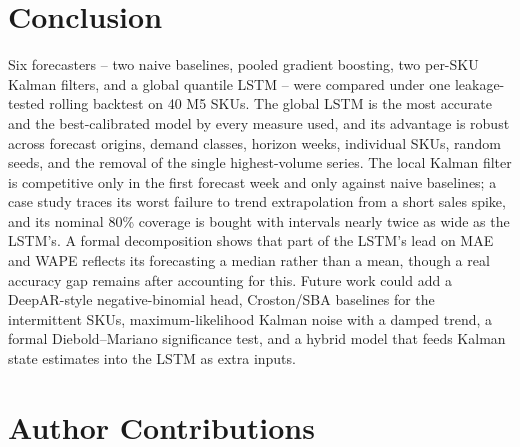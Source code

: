 \documentclass[conference]{IEEEtran}
\begin{document}
\section{Conclusion}
\label{sec:conclusion}
Six forecasters -- two naive baselines, pooled gradient boosting, two per-SKU Kalman filters, and a
global quantile LSTM -- were compared under one leakage-tested rolling backtest on 40 M5 SKUs. The
global LSTM is the most accurate and the best-calibrated model by every measure used, and its
advantage is robust across forecast origins, demand classes, horizon weeks, individual SKUs, random
seeds, and the removal of the single highest-volume series. The local Kalman filter is competitive
only in the first forecast week and only against naive baselines; a case study traces its worst
failure to trend extrapolation from a short sales spike, and its nominal 80\% coverage is bought
with intervals nearly twice as wide as the LSTM's. A formal decomposition shows that part of the
LSTM's lead on MAE and WAPE reflects its forecasting a median rather than a mean, though a
real accuracy gap remains after accounting for this. Future work could add a DeepAR-style
negative-binomial head, Croston/SBA baselines for the intermittent SKUs, maximum-likelihood Kalman
noise with a damped trend, a formal Diebold--Mariano significance test, and a hybrid model that
feeds Kalman state estimates into the LSTM as extra inputs.

\section*{Author Contributions}
\end{document}
